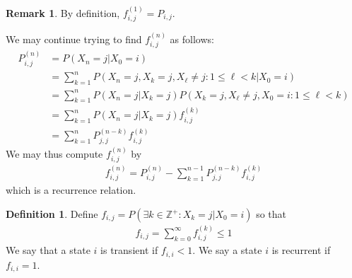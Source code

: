 \documentclass[11pt]{amsart}
\theoremstyle{definition}
\newtheorem{definition}[theorem]{Definition}
\newtheorem{remark}[theorem]{Remark}
\numberwithin{equation}{section}
\begin{document}
 \begin{remark}\label{ezformula}
     By definition, $f_{i,j}^{(1)}=P_{i,j}$.

     We may continue trying to find $f_{i,j}^{(n)}$ as follows:
     \begin{align*}
         P_{i,j}^{(n)}&=P(X_n=j|X_0=i)\\
         &=\sum_{k=1}^{n}P(X_n=j,X_k=j,X_{\ell}\ne j:1\le\ell< k|X_0=i)\\
         &=\sum_{k=1}^nP(X_n=j|X_k=j)P(X_k=j,X_\ell\ne j,X_0=i:1\le \ell<k)\\
         &=\sum_{k=1}^n P(X_n=j|X_k=j)f_{i,j}^{(k)}\\
         &=\sum_{k=1}^n P_{j,j}^{(n-k)}f_{i,j}^{(k)}
     \end{align*}
     We may thus compute $f_{i,j}^{(n)}$ by
     \begin{align*}
         f_{i,j}^{(n)}=P_{i,j}^{(n)}-\sum_{k=1}^{n-1}P_{j,j}^{(n-k)}f_{i,j}^{(k)}
     \end{align*}
     which is a recurrence relation.
 \end{remark}
 \begin{definition}
     Define $f_{i,j}=P(\exists k\in\mathbb Z^{+}:X_k=j|X_0=i)$ so that
     \begin{align*}
         f_{i,j}=\sum_{k=0}^\infty f_{i,j}^{(k)}\le1
     \end{align*}
     We say that a state $i$ is transient if $f_{i,i}<1$. We say a state $i$ is recurrent if $f_{i,i}=1$.
 \end{definition}
\end{document}
